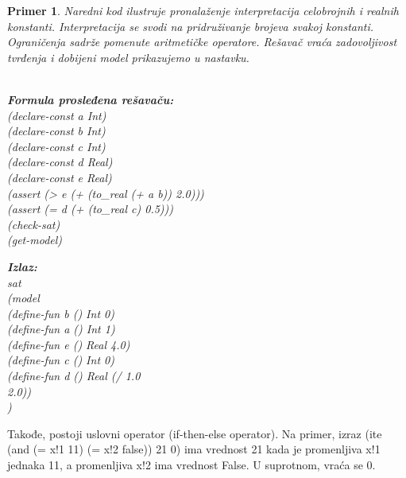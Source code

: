 \documentclass[12pt,oneside]{memoir}
\newcommand\tab[1][0.5cm]{\hspace*{#1}}
\newtheorem{primer}{Primer}
\begin{document}
\begin{primer} Naredni kod ilustruje pronalaženje interpretacija celobrojnih i realnih konstanti. Interpretacija se svodi na pridruživanje brojeva svakoj konstanti. Ograničenja sadrže pomenute aritmetičke operatore. Rešavač vraća zadovoljivost tvrđenja i dobijeni model prikazujemo u nastavku.\\ \\
\begin{minipage}[b]{0.47\textwidth}
\textbf{Formula prosleđena rešavaču:}
\\(declare-const a Int)
\\(declare-const b Int)
\\(declare-const c Int)
\\(declare-const d Real)
\\(declare-const e Real)
\\(assert (> e (+ (to\_real (+ a b)) 2.0)))
\\(assert (= d (+ (to\_real c) 0.5)))
\\(check-sat)
\\(get-model)
\end{minipage}
\hspace{1.6cm}
\begin{minipage}[t]{0.4\textwidth}
\vspace{-6cm}
\textbf{Izlaz:}
\\sat 
\\(model
\\\tab(define-fun b () Int 0) 
\\\tab(define-fun a () Int 1) 
\\\tab(define-fun e () Real 4.0) 
\\\tab(define-fun c () Int 0) 
\\\tab(define-fun d () Real (/ 1.0 
\\\tab 2.0))
\\)
\end{minipage}

\end{primer}


Takođe, postoji uslovni operator (if-then-else operator). Na primer,
izraz (ite (and (= x!1 11) (= x!2 false)) 21 0) ima vrednost 21 kada je promenljiva x!1 jednaka 11, a promenljiva x!2 ima vrednost False. U suprotnom, vraća se 0.
\end{document}

